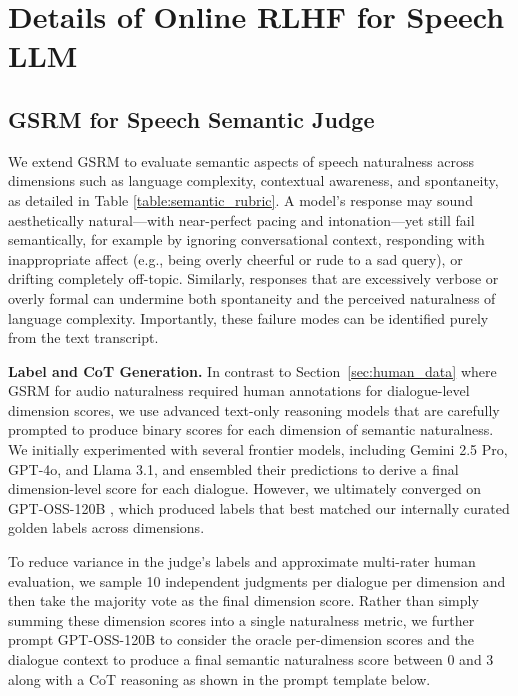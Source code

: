 \section{Details of Online RLHF for Speech LLM} \label{sec:rlhf_gtrm}


\subsection{GSRM for Speech Semantic Judge} \label{sec:semantic_judge}

We extend GSRM to evaluate semantic aspects of speech naturalness across dimensions such as language complexity, contextual awareness, and spontaneity, as detailed in Table \ref{table:semantic_rubric}. A model’s response may sound aesthetically natural—with near-perfect pacing and intonation—yet still fail semantically, for example by ignoring conversational context, responding with inappropriate affect (e.g., being overly cheerful or rude to a sad query), or drifting completely off-topic. Similarly, responses that are excessively verbose or overly formal can undermine both spontaneity and the perceived naturalness of language complexity. Importantly, these failure modes can be identified purely from the text transcript.

\textbf{Label and CoT Generation.} In contrast to Section~\ref{sec:human_data} where GSRM for audio naturalness required human annotations for dialogue-level dimension scores, we use advanced text-only reasoning models that are carefully prompted to produce binary scores for each dimension of semantic naturalness. We initially experimented with several frontier models, including Gemini 2.5 Pro, GPT-4o, and Llama 3.1, and ensembled their predictions to derive a final dimension-level score for each dialogue. However, we ultimately converged on GPT-OSS-120B \citep{agarwal2025gpt}, which produced labels that best matched our internally curated golden labels across dimensions.

To reduce variance in the judge’s labels and approximate multi-rater human evaluation, we sample 10 independent judgments per dialogue per dimension and then take the majority vote as the final dimension score. Rather than simply summing these dimension scores into a single naturalness metric, we further prompt GPT-OSS-120B to consider the oracle per-dimension scores and the dialogue context to produce a final semantic naturalness score between 0 and 3 along with a CoT reasoning as shown in the prompt template below.  



